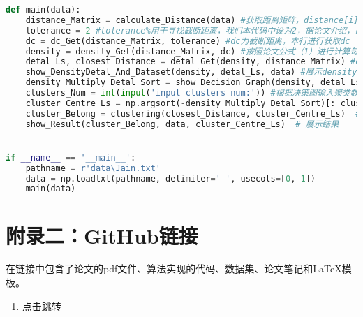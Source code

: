 \begin{lstlisting}[language=python]
def main(data):
    distance_Matrix = calculate_Distance(data) #获取距离矩阵，distance[i][j]表示第i个元素和第j个元素之间的欧式距离
    tolerance = 2 #tolerance%用于寻找截断距离，我们本代码中设为2，据论文介绍，截断距离的对聚类的影响不太大
    dc = dc_Get(distance_Matrix, tolerance) #dc为截断距离，本行进行获取dc
    density = density_Get(distance_Matrix, dc) #按照论文公式（1）进行计算每个点的local density
    detal_Ls, closest_Distance = detal_Get(density, distance_Matrix) #detal_ls存储每个点的detal值，closest_distance存储比当前点密度高的点集中最近的距离点的索引
    show_DensityDetal_And_Dataset(density, detal_Ls, data) #展示density-detal散点图和原始data图
    density_Multiply_Detal_Sort = show_Decision_Graph(density, detal_Ls) #展示决策图，返回标准化后的density和detal乘积（已经进行排序）
    clusters_Num = int(input('input clusters num:')) #根据决策图输入聚类数
    cluster_Centre_Ls = np.argsort(-density_Multiply_Detal_Sort)[: clusters_Num] #获取聚类中心点的集合
    cluster_Belong = clustering(closest_Distance, cluster_Centre_Ls)  # 确定各点的最终归属（哪个司令）
    show_Result(cluster_Belong, data, cluster_Centre_Ls)  # 展示结果


if __name__ == '__main__':
    pathname = r'data\Jain.txt'
    data = np.loadtxt(pathname, delimiter='	', usecols=[0, 1])
    main(data)
\end{lstlisting}






\section{附录二：GitHub链接}
在链接中包含了论文的pdf文件、算法实现的代码、数据集、论文笔记和LaTeX模板。
\begin{enumerate}
\item \textcolor{blue}{ \href{https://github.com/Venture-Zhao/Clustering-by-fast-search-and-find-of-density-peaks-Paper-notes}{点击跳转}}
\end{enumerate}

